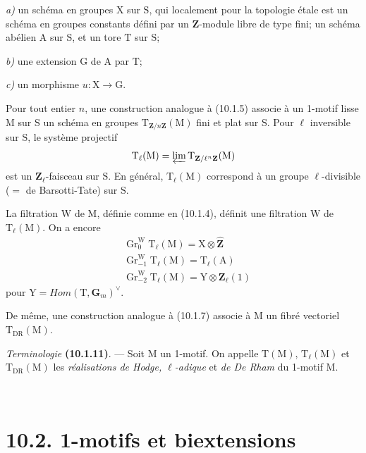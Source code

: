 \documentclass[11pt,leqno]{article}
\newcommand{\Page}[1]{\ifvmode\noindent\else\unskip\ \fi{\footnotesize\textcolor{gray}{[p.\,#1]}}\ \ignorespaces}
\begin{document}
\noindent \textit{a)} un schéma en groupes \(\mathrm{X}\) sur
\(\mathrm{S}\), qui localement pour la topologie étale est un schéma en
groupes constants défini par un \(\mathbf{Z}\)-module libre de type
fini; un schéma abélien \(\mathrm{A}\) sur \(\mathrm{S}\), et un tore
\(\mathrm{T}\) sur \(\mathrm{S}\);\par
\noindent \textit{b)} une extension \(\mathrm{G}\) de \(\mathrm{A}\)
par \(\mathrm{T}\);\par
\noindent \textit{c)} un morphisme \(u:\mathrm{X}\to\mathrm{G}\).

Pour tout entier \(n\), une construction analogue à (10.1.5) associe
à un 1-motif lisse \(\mathrm{M}\) sur \(\mathrm{S}\) un schéma en
groupes \(\mathrm{T}_{\mathbf{Z}/n\mathbf{Z}}(\mathrm{M})\) fini et
plat sur \(\mathrm{S}\). Pour \(\ell\) inversible sur \(\mathrm{S}\),
le système projectif
\[
\mathrm{T}_{\ell}(\mathrm{M})
=\varprojlim\mathrm{T}_{\mathbf{Z}/\ell^n\mathbf{Z}}(\mathrm{M})
\]
est un \(\mathbf{Z}_{\ell}\)-faisceau sur \(\mathrm{S}\). En général,
\(\mathrm{T}_{\ell}(\mathrm{M})\) correspond à un groupe
\(\ell\)-divisible (\(=\) de Barsotti-Tate) sur \(\mathrm{S}\).

La filtration \(\mathrm{W}\) de \(\mathrm{M}\), définie comme en
(10.1.4), définit une filtration \(\mathrm{W}\) de
\(\mathrm{T}_{\ell}(\mathrm{M})\). On a encore
\[
\begin{aligned}
&\operatorname{Gr}^{\mathrm{W}}_0\mathrm{T}_{\ell}(\mathrm{M})
  =\mathrm{X}\otimes\widehat{\mathbf{Z}}
\\
&\operatorname{Gr}^{\mathrm{W}}_{-1}\mathrm{T}_{\ell}(\mathrm{M})
  =\mathrm{T}_{\ell}(\mathrm{A})
\\
&\operatorname{Gr}^{\mathrm{W}}_{-2}\mathrm{T}_{\ell}(\mathrm{M})
  =\mathrm{Y}\otimes\mathbf{Z}_{\ell}(1)
\end{aligned}
\]
pour \(\mathrm{Y}=\mathit{Hom}(\mathrm{T},\mathbf{G}_m)^{\vee}\).

De même, une construction analogue à (10.1.7) associe à \(\mathrm{M}\)
un fibré vectoriel \(\mathrm{T}_{\mathrm{DR}}(\mathrm{M})\).

\textit{Terminologie} \textbf{(10.1.11)}. —
Soit \(\mathrm{M}\) un 1-motif. On appelle \(\mathrm{T}(\mathrm{M})\),
\(\mathrm{T}_{\ell}(\mathrm{M})\) et
\(\mathrm{T}_{\mathrm{DR}}(\mathrm{M})\) les
\textit{réalisations de Hodge, \(\ell\)-adique} et
\textit{de De Rham} du 1-motif \(\mathrm{M}\).

\Page{60}
\section*{10.2. 1-motifs et biextensions}
\end{document}
